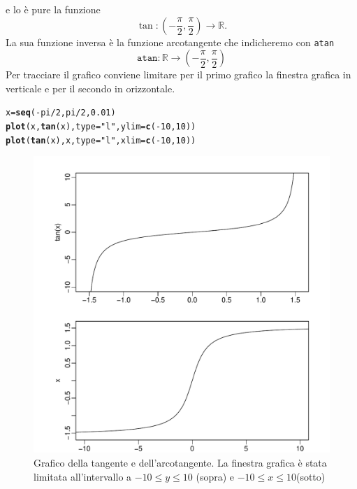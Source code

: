 \documentclass[onecolumn,11pt]{book}\usepackage[]{graphicx}\usepackage[]{color}
\makeatletter
\def\maxwidth{ %
  \ifdim\Gin@nat@width>\linewidth
    \linewidth
  \else
    \Gin@nat@width
  \fi
}
\newcommand{\hlnum}[1]{\textcolor[rgb]{0.686,0.059,0.569}{#1}}%
\newcommand{\hlstr}[1]{\textcolor[rgb]{0.192,0.494,0.8}{#1}}%
\newcommand{\hlopt}[1]{\textcolor[rgb]{0,0,0}{#1}}%
\newcommand{\hlstd}[1]{\textcolor[rgb]{0.345,0.345,0.345}{#1}}%
\newcommand{\hlkwb}[1]{\textcolor[rgb]{0.69,0.353,0.396}{#1}}%
\newcommand{\hlkwc}[1]{\textcolor[rgb]{0.333,0.667,0.333}{#1}}%
\newcommand{\hlkwd}[1]{\textcolor[rgb]{0.737,0.353,0.396}{\textbf{#1}}}%
\newenvironment{kframe}{%
 \def\at@end@of@kframe{}%
 \ifinner\ifhmode%
  \def\at@end@of@kframe{\end{minipage}}%
  \begin{minipage}{\columnwidth}%
 \fi\fi%
 \def\FrameCommand##1{\hskip\@totalleftmargin \hskip-\fboxsep
 \colorbox{shadecolor}{##1}\hskip-\fboxsep
     \hskip-\linewidth \hskip-\@totalleftmargin \hskip\columnwidth}%
 \MakeFramed {\advance\hsize-\width
   \@totalleftmargin\z@ \linewidth\hsize
   \@setminipage}}%
 {\par\unskip\endMakeFramed%
 \at@end@of@kframe}
\newenvironment{knitrout}{}{} %
\makeatother
\begin{document}
e lo \`e pure la funzione
$$\tan\colon (-\frac{\pi}2 ,\frac{\pi}2)\rightarrow \mathbb{R}.$$
La sua funzione inversa \`e  la funzione arcotangente che indicheremo con \texttt{atan}
$$\texttt{atan}\colon  \mathbb R \rightarrow (-\frac{\pi}{2},\frac{\pi}{2})$$
Per tracciare il grafico conviene limitare per il primo grafico la finestra grafica in verticale e per il secondo in orizzontale.
\begin{knitrout}
\color{fgcolor}\begin{kframe}
\begin{alltt}
\hlstd{x}\hlkwb{=}\hlkwd{seq}\hlstd{(}\hlopt{-}\hlstd{pi}\hlopt{/}\hlnum{2}\hlstd{,pi}\hlopt{/}\hlnum{2}\hlstd{,}\hlnum{0.01}\hlstd{)}
\hlkwd{plot}\hlstd{(x,}\hlkwd{tan}\hlstd{(x),}\hlkwc{type}\hlstd{=}\hlstr{"l"}\hlstd{,}\hlkwc{ylim}\hlstd{=}\hlkwd{c}\hlstd{(}\hlopt{-}\hlnum{10}\hlstd{,}\hlnum{10}\hlstd{))}
\hlkwd{plot}\hlstd{(}\hlkwd{tan}\hlstd{(x),x,}\hlkwc{type}\hlstd{=}\hlstr{"l"}\hlstd{,}\hlkwc{xlim}\hlstd{=}\hlkwd{c}\hlstd{(}\hlopt{-}\hlnum{10}\hlstd{,}\hlnum{10}\hlstd{))}
\end{alltt}
\end{kframe}
\end{knitrout}
\begin{center}\begin{figure}

\begin{knitrout}
\color{fgcolor}
\includegraphics[width=\maxwidth]{figure/unnamed-chunk-105-1} 

\end{knitrout}
\caption{Grafico della tangente e dell'arcotangente. La finestra grafica \`e  stata limitata all'intervallo a $-10\leq y\leq 10$  (sopra) e
$-10\leq x\leq 10 $(sotto)}
\end{figure}

\end{center}
\end{document}
